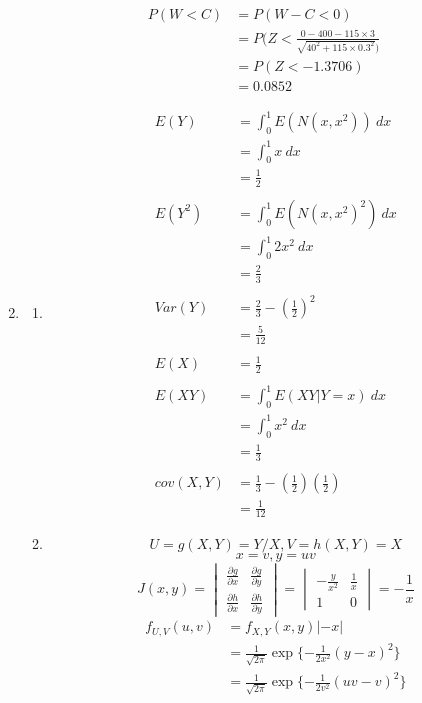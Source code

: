 \documentclass[12pt]{article}
\theoremstyle{definition}
\begin{document}
\begin{enumerate}
\begin{align*}
P(W < C) &= P(W - C < 0) \\
    &= P(Z < \frac{0-400 - 115 \times 3}{\sqrt{40^2 + 115 \times 0.3^2})} \\
    &= P(Z < -1.3706) \\
    &= 0.0852
\end{align*}
\item
\begin{enumerate}[label=(\alph*)]
\item
\begin{align*}
E(Y) &= \int_0^1 E(N(x,x^2)) \ dx \\
    &= \int_0^1 x \ dx \\
    &= \frac{1}{2} \\ \\
E(Y^2) &= \int_0^1 E(N(x,x^2)^2) \ dx \\
    &= \int_0^1 2x^2 \ dx \\
    &= \frac{2}{3} \\ \\
Var(Y) &= \frac{2}{3} - (\frac{1}{2})^2 \\
    &= \frac{5}{12} \\ \\
E(X) &= \frac{1}{2} \\ \\
E(XY) &= \int_0^1 E(XY|Y = x) \ dx \\
    &= \int_0^1 x^2 \ dx \\
    &= \frac{1}{3} \\ \\
cov(X,Y) &= \frac{1}{3} - (\frac{1}{2})(\frac{1}{2}) \\
    &= \frac{1}{12}
\end{align*}
\item
\[U = g(X,Y) = Y/X, V = h(X,Y) = X\]
\[x = v, y = uv\]
\[J(x,y) = \begin{vmatrix}
\frac{\partial g}{\partial x} & \frac{\partial g}{\partial y}\\
\frac{\partial h}{\partial x} & \frac{\partial h}{\partial y}
\end{vmatrix}
= \begin{vmatrix}
-\frac{y}{x^2} & \frac{1}{x} \\
1 & 0
\end{vmatrix}
= -\frac{1}{x}\]
\begin{align*}
f_{U,V}(u,v) &= f_{X,Y}(x,y) |-x| \\
    &= \frac{1}{\sqrt{2\pi}} \exp\{-\frac{1}{2x^2} (y-x)^2\} \\
    &= \frac{1}{\sqrt{2\pi}} \exp\{-\frac{1}{2v^2} (uv-v)^2\} \\

\end{align*}
\end{enumerate}
\end{enumerate}
\end{document}
